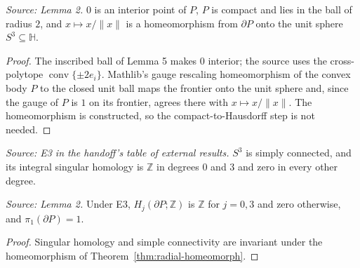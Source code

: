 \begin{theorem}
  \label{thm:radial-homeomorph}
  \leanok
  \textit{Source: Lemma 2.}
  \(0\) is an interior point of \(P\), \(P\) is compact and lies in the
  ball of radius \(2\), and \(x\mapsto x/\|x\|\) is a homeomorphism from
  \(\partial P\) onto the unit sphere \(S^3\subseteq\mathbb H\).
\end{theorem}
\begin{proof}
  \leanok
  The inscribed ball of Lemma 5 makes \(0\) interior; the source uses the
  cross-polytope \(\operatorname{conv}\{\pm2e_i\}\). Mathlib's gauge
  rescaling homeomorphism of the convex body \(P\) to the closed unit ball
  maps the frontier onto the unit sphere and, since the gauge of \(P\) is
  \(1\) on its frontier, agrees there with \(x\mapsto x/\|x\|\). The
  homeomorphism is constructed, so the compact-to-Hausdorff step is not
  needed.
\end{proof}

\begin{definition}[E3 as a hypothesis]
  \label{def:sphere-topology}
  \leanok
  \textit{Source: E3 in the handoff's table of external results.}
  \(S^3\) is simply connected, and its integral singular homology is
  \(\mathbb Z\) in degrees \(0\) and \(3\) and zero in every other degree.
\end{definition}

\begin{theorem}[Lemma 2]
  \label{thm:radial-topology}
  \leanok
  \textit{Source: Lemma 2.}
  Under E3, \(H_j(\partial P;\mathbb Z)\) is \(\mathbb Z\) for \(j=0,3\)
  and zero otherwise, and \(\pi_1(\partial P)=1\).
\end{theorem}
\begin{proof}
  \leanok
  Singular homology and simple connectivity are invariant under the
  homeomorphism of Theorem~\ref{thm:radial-homeomorph}.
\end{proof}

